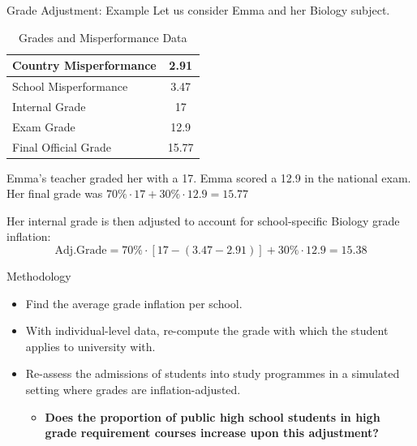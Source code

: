 \documentclass{beamer}
\begin{document}
\begin{frame}{Grade Adjustment: Example}
    Let us consider Emma and her Biology subject.
    
\begin{table}[h!]
\centering
\begin{tabular}{|l|c|}
\hline
Country Misperformance & 2.91 \\ \hline
School Misperformance  & 3.47 \\ \hline
Internal Grade         & 17 \\ \hline
Exam Grade             & 12.9 \\ \hline
Final Official Grade   & 15.77 \\ \hline
\end{tabular}
\caption{Grades and Misperformance Data}
\end{table}

Emma's teacher graded her with a 17. Emma scored a 12.9 in the national exam. Her final grade was  $70\% \cdot 17+30\% \cdot 12.9=15.77$ 

Her internal grade is then adjusted to account for school-specific Biology grade inflation: 
\[\text{Adj.Grade}=70\% \cdot [17-(3.47-2.91)]+30\% \cdot 12.9 = 15.38\]




\end{frame}

\begin{frame}{Methodology}
    \begin{itemize}
    \item Find the average grade inflation per school.
    \item With individual-level data, re-compute the grade with which the student applies to university with.
    \item Re-assess the admissions of students into study programmes in a simulated setting where grades are inflation-adjusted.
    \begin{itemize}
        \item \textbf{Does the proportion of public high school students in high grade requirement courses  increase upon this adjustment?}
    \end{itemize} 
\end{itemize}

\end{frame}
\end{document}
